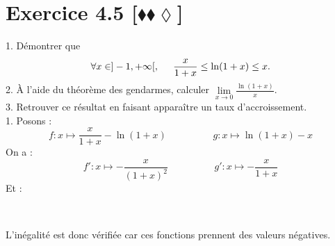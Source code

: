 \documentclass[10pt]{article}
\begin{document}
\section*{Exercice 4.5 [$\blacklozenge\blacklozenge\lozenge$]}
\begin{tcolorbox}[enhanced, width=7in, center, size=fbox, fontupper=\large, drop shadow southwest]
    1. Démontrer que
    \begin{equation*}
        \forall x\in]-1,+\infty[, \hspace{0.5cm} \frac{x}{1+x}\leq\ln(1+x)\leq x.
    \end{equation*}
    2. À l'aide du théorème des gendarmes, calculer $\lim\limits_{x\rightarrow0}{\frac{\ln(1+x)}{x}}$.\\
    3. Retrouver ce résultat en faisant apparaître un taux d'accroissement.\\[0.25cm]
    1. Posons :
    \begin{equation*}
        f:x\mapsto\frac{x}{1+x}-\ln(1+x) \hspace{2cm} g:x\mapsto\ln(1+x)-x
    \end{equation*}
    On a :
    \begin{equation*}
        f':x\mapsto-\frac{x}{(1+x)^2} \hspace{2cm} g':x\mapsto-\frac{x}{1+x}
    \end{equation*}
    Et :
    \begin{center}
        \\[0.25cm]
    \end{center}
    L'inégalité est donc vérifiée car ces fonctions prennent des valeurs négatives.
\end{tcolorbox}
\end{document}
